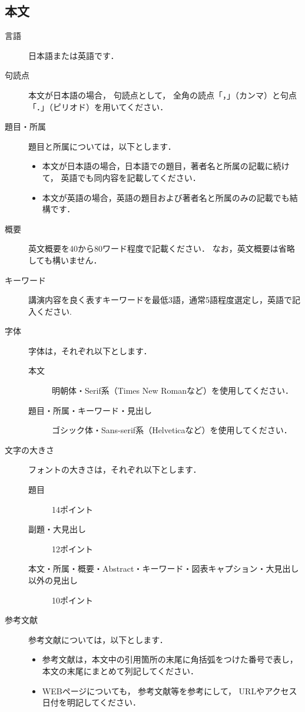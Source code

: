 \documentclass{ltjoc}
\begin{document}
\subsection{本文}
\begin{description}
\item [言語]
  日本語または英語です．
\item [句読点]
  本文が日本語の場合，
  句読点として，
  全角の読点「，」（カンマ）と句点「．」（ピリオド）を用いてください． 
\item [題目・所属]
  題目と所属については，以下とします．
  \begin{itemize}
  \item 
  本文が日本語の場合，日本語での題目，著者名と所属の記載に続けて，
  英語でも同内容を記載してください．
  \item 
  本文が英語の場合，英語の題目および著者名と所属のみの記載でも結構です．
  \end{itemize}
\item [概要]
  英文概要を40から80ワード程度で記載ください．
  なお，英文概要は省略しても構いません．
\item [キーワード]
  講演内容を良く表すキーワードを最低3語，通常5語程度選定し，英語で記入ください.
\item [字体]
  字体は，それぞれ以下とします．
  \begin{description}
  \item 
    [本文]
    明朝体・Serif系（Times New Romanなど）を使用してください．
  \item 
    [題目・所属・キーワード・見出し]
    ゴシック体・Sans-serif系（Helveticaなど）を使用してください．
  \end{description}
\item [文字の大きさ]
  フォントの大きさは，それぞれ以下とします．
  \begin{description}
  \item [題目]
    14ポイント
  \item [副題・大見出し]
    12ポイント
  \item [本文・所属・概要・Abstract・キーワード・図表キャプション・大見出し以外の見出し]
    10ポイント
  \end{description}
\item [参考文献]
  参考文献については，以下とします．
  \begin{itemize}
  \item 
  参考文献は，本文中の引用箇所の末尾に角括弧をつけた番号で表し，
  本文の末尾にまとめて列記してください．
  \item 
  WEBページについても，
  参考文献\cite{SIST02-200}等を参考にして，
  URLやアクセス日付を明記してください．
  \end{itemize}
\end{description}
\end{document}

